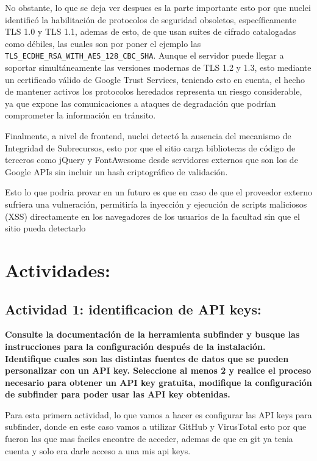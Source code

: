 \documentclass[letterpaper,11pt]{article}
\begin{document}
No obstante, lo que se deja ver despues 
es la parte importante esto por que nuclei identificó 
la habilitación de protocolos de seguridad obsoletos, 
específicamente TLS 1.0 y TLS 1.1, 
ademas de esto, de que usan suites de cifrado catalogadas 
como débiles, las cuales son por poner el ejemplo las 
\texttt{TLS\_ECDHE\_RSA\_WITH\_AES\_128\_CBC\_SHA}. 
Aunque el servidor puede llegar a soportar simultáneamente 
las versiones modernas de TLS 1.2 y 1.3, esto 
mediante un certificado válido de Google Trust Services, teniendo esto en cuenta, el hecho de
mantener activos los protocolos heredados representa un riesgo considerable, ya que expone las comunicaciones a ataques de degradación
que podrían comprometer la información en tránsito.

Finalmente, a nivel de frontend, 
nuclei detectó la ausencia del mecanismo 
de Integridad de Subrecursos, esto por que 
el sitio carga bibliotecas de código de terceros 
como jQuery y FontAwesome desde servidores externos que son los de
Google APIs sin incluir un hash criptográfico de validación. 

Esto lo que podria provar en un futuro es que en caso de que el proveedor externo sufriera una vulneración, permitiría la inyección y ejecución de scripts maliciosos (XSS) 
directamente en los navegadores de los usuarios de la facultad sin que el sitio pueda detectarlo

\section{Actividades:}
\subsection{Actividad 1: identificacion de API keys:}

\textbf{Consulte la documentación de la herramienta subfinder y busque las instrucciones
para la configuración después de la instalación. Identifique cuales son las distintas
fuentes de datos que se pueden personalizar con un API key. Seleccione al menos 2
y realice el proceso necesario para obtener un API key gratuita, modifique la
configuración de subfinder para poder usar las API key obtenidas.}

Para esta primera actividad, lo que vamos a hacer es 
configurar las API keys para subfinder, 
donde en este caso vamos a utilizar GitHub y VirusTotal 
esto por que fueron las que mas faciles encontre de acceder, ademas de que en git ya tenia cuenta 
y solo era darle acceso a una mis api keys.
\end{document}
